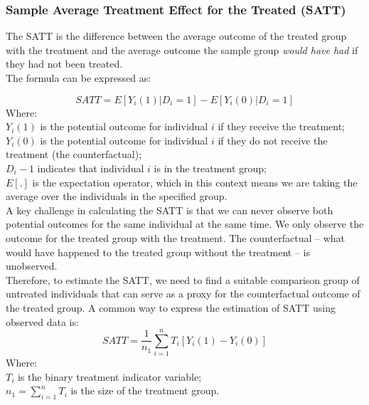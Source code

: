 \documentclass{article}
\begin{document}
    \subsubsection{Sample Average Treatment Effect for the Treated (SATT)}

    \noindent The SATT is the difference between the average outcome of the
treated group with the treatment and the average outcome the sample group \textit{would have had} if they had not been treated.\\

    \noindent The formula can be expressed as:

    \[
        SATT = E[Y_{i}(1)|D_{i}=1] - E[Y_{i}(0)|D_{i}=1]
    \]
    \indent Where:\\
    \indent $Y_i(1)$ is the potential outcome for individual $i$ if
they receive the treatment;\\
    \indent $Y_i(0)$ is the potential outcome for individual $i$ if
they do not receive the treatment (the counterfactual);\\
    \indent $D_i-1$ indicates that individual $i$ is in the treatment group;\\
    \indent $E[.]$ is the expectation operator, which in this context means
we are taking the average over the individuals in the specified group.\\

    \noindent A key challenge in calculating the SATT is that we can never
observe both potential outcomes for the same individual at the same time. We
only observe the outcome for the treated group with the treatment. The
counterfactual -- what would have happened to the treated group without the
treatment -- is unobserved.\\

    \noindent Therefore, to estimate the SATT, we need to find a suitable
comparison group of untreated individuals that can serve as a proxy for
the counterfactual outcome of the treated group. A common way to express
the estimation of SATT using observed data is:\\

    \[
        SATT = \frac{1}{n_1} \sum^n_{i=1}T_i[Y_i(1)-Y_i(0)]
    \]
    \indent Where:\\
    \indent $T_i$ is the binary treatment indicator variable;\\
    \indent $n_1 = \sum^n_{i=1}T_i$ is the size of the treatment group.\\
\end{document}

